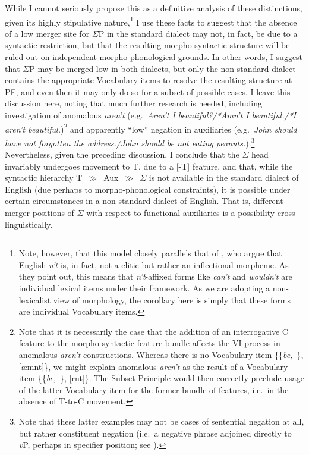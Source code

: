 While I cannot seriously propose this as a definitive analysis of these distinctions, given its highly stipulative nature,\footnote{Note, however, that this model closely parallels that of \citet{zwicky_pullum1983}, who argue that English {\it n't} is, in fact, not a clitic but rather an inflectional morpheme. As they point out, this means that {\it n't}-affixed forms like {\it can't} and {\it wouldn't} are individual lexical items under their framework. As we are adopting a non-lexicalist view of morphology, the corollary here is simply that these forms are individual Vocabulary items.} I use these facts to suggest that the absence of a low merger site for $\Sigma$P in the standard dialect may not, in fact, be due to a syntactic restriction, but that the resulting morpho-syntactic structure will be ruled out on independent morpho-phonological grounds. In other words, I suggest that $\Sigma$P may be merged low in both dialects, but only the non-standard dialect contains the appropriate Vocabulary items to resolve the resulting structure at PF, and even then it may only do so for a subset of possible cases. I leave this discussion here, noting that much further research is needed, including investigation of anomalous {\it aren't} (e.g.\ {\it Aren't I beautiful?/*Amn't I beautiful./*I aren't beautiful.})\footnote{\label{anom_arent_fn}Note that it is necessarily the case that the addition of an interrogative C feature to the morpho-syntactic feature bundle affects the VI process in anomalous {\it aren't} constructions. Whereas there is no Vocabulary item \{\{\mbox{\textit{be, }}\}, [\ae mnt]\}, we might explain anomalous {\it aren't} as the result of a Vocabulary item \{\{\mbox{\textit{be, }}\}, [\textscripta rnt]\}. The Subset Principle would then correctly preclude usage of the latter Vocabulary item for the former bundle of features, i.e.\ in the absence of T-to-C movement.} and apparently ``low'' negation in auxiliaries (e.g.\ {\it John should have not forgotten the address./John should be not eating peanuts.}).\footnote{Note that these latter examples may not be cases of sentential negation at all, but rather constituent negation (i.e.\ a negative phrase adjoined directly to {\it v}P, perhaps in specifier position; see ).} Nevertheless, given the preceding discussion, I conclude that the $\Sigma$ head invariably undergoes movement to T, due to a [-T] feature, and that, while the syntactic hierarchy T~$\gg$~Aux~$\gg$~$\Sigma$ is not available in the standard dialect of English (due perhaps to morpho-phonological constraints), it is possible under certain circumstances in a non-standard dialect of English. That is, different merger positions of $\Sigma$ with respect to functional auxiliaries is a possibility cross-linguistically.


